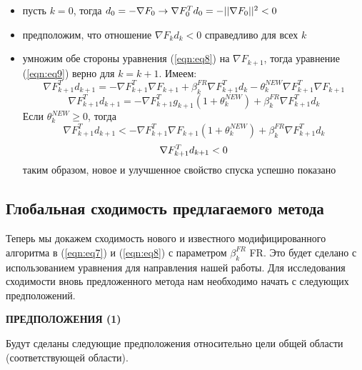 \begin{itemize}
    \item пусть $k = 0$, тогда $d_{0}=-{\cal \nabla}F_{0}\to{\cal \nabla}F_{0}^{T}d_{0}=-\vert\vert{\cal \nabla}F_{0}\vert\vert^{2}<0$
    \item предположим, что отношение $\nabla F_{k}d_{k}<0$ справедливо для всех $k$
    \item умножим обе стороны уравнения (\ref{eqn:eq8}) на $\nabla F_{k+1}$, тогда уравнение
    (\ref{eqn:eq9}) верно для $k = k + 1$. Имеем:
    \begin{equation*}
        \nabla F_{k+1}^{T}d_{k+1}=-\nabla F_{k+1}^{T}\nabla F_{k+1}+\beta_{k}^{FR}\nabla F_{k+1}^{T}d_{k}-\theta_{k}^{N E W}\nabla F_{k+1}^{T}\nabla F_{k+1}
    \end{equation*}
    \begin{equation*}
        \nabla F_{k+1}^{T}d_{k+1}=-\nabla F_{k+1}^{T}g_{k+1}(1+\theta_{k}^{N E W})+\beta_{k}^{F R}\nabla F_{k+1}^{T}d_{k}
    \end{equation*}
    Если $\theta_{k}^{NEW} \ge 0$, тогда
    \begin{equation*}
        \nabla F_{k+1}^{T}d_{k+1}<-\nabla F_{k+1}^{T}\nabla F_{k+1}(1+\theta_{k}^{N E W})+\beta_{k}^{F R}\nabla F_{k+1}^{T}d_{k}
    \end{equation*}
    \begin{equation*}
        {\cal \nabla}F_{k+1}^{T}d_{k+1}<0
    \end{equation*}
    таким образом, новое и улучшенное свойство спуска успешно показано
\end{itemize}

\subsection{Глобальная сходимость предлагаемого метода}

Теперь мы докажем сходимость нового и известного модифицированного алгоритма в
(\ref{eqn:eq7}) и (\ref{eqn:eq8}) с параметром  $\beta_{k}^{FR}$  FR. Это будет
сделано с использованием уравнения для направления нашей работы. Для
исследования сходимости вновь предложенного метода нам необходимо начать с
следующих предположений.

\noindent \textbf{ПРЕДПОЛОЖЕНИЯ (1)}

Будут сделаны следующие предположения относительно цели общей области
(соответствующей области).

